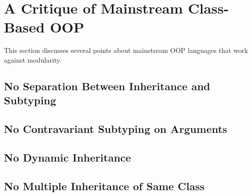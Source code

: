\section{A Critique of Mainstream Class-Based OOP}

This section discusses several points about mainstream OOP languages
that work against modularity. 

\subsection{No Separation Between Inheritance and Subtyping}

\subsection{No Contravariant Subtyping on Arguments}

\subsection{No Dynamic Inheritance}

\subsection{No Multiple Inheritance of Same Class}